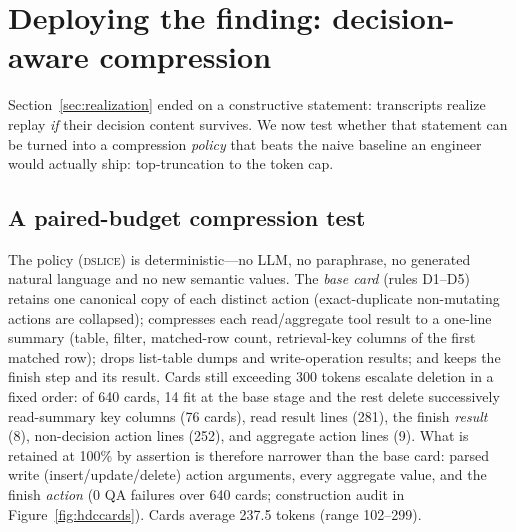 \section{Deploying the finding: decision-aware compression}
\label{sec:deployment}

Section~\ref{sec:realization} ended on a constructive statement: transcripts realize replay \emph{if} their decision content survives. We now test whether that statement can be turned into a compression \emph{policy} that beats the naive baseline an engineer would actually ship: top-truncation to the token cap.

\subsection{A paired-budget compression test}
\label{ssec:dctest}

The policy (\textsc{dslice}) is deterministic---no LLM, no paraphrase, no generated natural language and no new semantic values. The \emph{base card} (rules D1--D5) retains one canonical copy of each distinct action (exact-duplicate non-mutating actions are collapsed); compresses each read/aggregate tool result to a one-line summary (table, filter, matched-row count, retrieval-key columns of the first matched row); drops list-table dumps and write-operation results; and keeps the finish step and its result. Cards still exceeding 300 tokens escalate deletion in a fixed order: of 640 cards, 14 fit at the base stage and the rest delete successively read-summary key columns (76 cards), read result lines (281), the finish \emph{result} (8), non-decision action lines (252), and aggregate action lines (9). What is retained at 100\% by assertion is therefore narrower than the base card: parsed write (insert/update/delete) action arguments, every aggregate value, and the finish \emph{action} ($0$ QA failures over 640 cards; construction audit in Figure~\ref{fig:hdccards}). Cards average 237.5 tokens (range 102--299).

